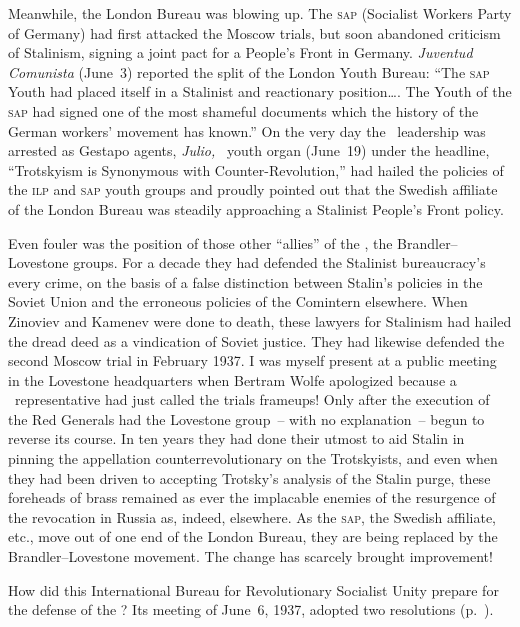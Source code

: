 Meanwhile, the London Bureau was blowing up. The \textsc{sap} (Socialist Workers Party of Germany) had first attacked the Moscow trials, but soon abandoned criticism of Stalinism, signing a joint pact for a People’s Front in Germany. \emph{Juventud Comunista} (June~3) reported the split of the London Youth Bureau: ``The \textsc{sap} Youth had placed itself in a Stalinist and reactionary position\dots. The Youth of the \textsc{sap} had signed one of the most shameful documents which the history of the German workers’ movement has known.\kn\kn'' On the very day the \POUM\ leadership was arrested as Gestapo agents, \emph{Julio,} \PSUC\ youth organ (June~19) under the headline, ``Trotskyism is Synonymous with Counter-Revolution,\kn\kn'' had hailed the policies of the \textsc{ilp} and \textsc{sap} youth groups and proudly pointed out that the Swedish affiliate of the London Bureau was steadily approaching a Stalinist People’s Front policy.

Even fouler was the position of those other ``allies'' of the \POUM\kn, the Brandler–Lovestone groups. For a decade they had defended the Stalinist bureaucracy’s every crime, on the basis of a false distinction between Stalin’s policies in the Soviet Union and the erroneous policies of the Comintern elsewhere. When Zinoviev and Kamenev were done to death, these lawyers for Stalinism had hailed the dread deed as a vindication of Soviet justice. They had likewise defended the second Moscow trial in February 1937. I was myself present at a public meeting in the Lovestone headquarters when Bertram Wolfe apologized because a \POUM\ representative had just called the trials frameups! Only after the execution of the Red Generals had the Lovestone group~-- with no explanation~-- begun to reverse its course. In ten years they had done their utmost to aid Stalin in pinning the appellation counterrevolutionary on the Trotskyists, and even when they had been driven to accepting Trotsky’s analysis of the Stalin purge, these foreheads of brass remained as ever the implacable enemies of the resurgence of the revocation in Russia as, indeed, elsewhere. As the \textsc{sap,} the Swedish affiliate, etc., move out of one end of the London Bureau, they are being replaced by the Brandler–Lovestone movement. The change has scarcely brought improvement!

How did this International Bureau for Revolutionary Socialist Unity prepare for the defense of the \POUM? Its meeting of June~6, 1937\kn, adopted two resolutions (p.~\pageref{fig:intlbureau}).

